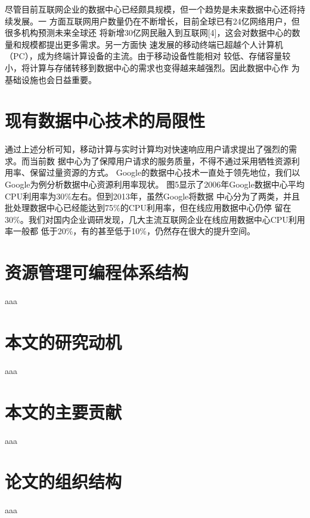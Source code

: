 尽管目前互联网企业的数据中心已经颇具规模，但一个趋势是未来数据中心还将持续发展。一
方面互联网用户数量仍在不断增长，目前全球已有24亿网络用户，但很多机构预测未来全球还
将新增30亿网民融入到互联网[4]，这会对数据中心的数量和规模都提出更多需求。另一方面快
速发展的移动终端已超越个人计算机（PC），成为终端计算设备的主流。由于移动设备性能相对
较低、存储容量较小，将计算与存储转移到数据中心的需求也变得越来越强烈。因此数据中心作
为基础设施也会日益重要。


\section{现有数据中心技术的局限性}

通过上述分析可知，移动计算与实时计算均对快速响应用户请求提出了强烈的需求。而当前数
据中心为了保障用户请求的服务质量，不得不通过采用牺牲资源利用率、保留过量资源的方式。
Google的数据中心技术一直处于领先地位，我们以Google为例分析数据中心资源利用率现状。
图5显示了2006年Google数据中心平均CPU利用率为30\%左右。但到2013年，虽然Google将数据
中心分为了两类，并且批处理数据中心已经能达到75\%的CPU利用率，但在线应用数据中心仍停
留在30\%。我们对国内企业调研发现，几大主流互联网企业在线应用数据中心CPU利用率一般都
低于20\%，有的甚至低于10\%，仍然存在很大的提升空间。

\section{资源管理可编程体系结构}
aaa

\section{本文的研究动机}
aaa

\section{本文的主要贡献}
aaa

\section{论文的组织结构}
aaa

